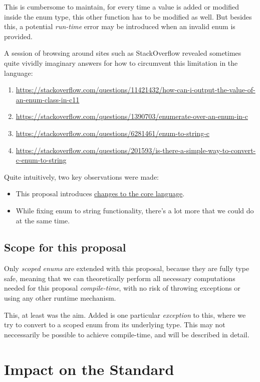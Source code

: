 \documentclass[
  format=manuscript,
  screen=true,
  review=false,
  nonacm=true,
  timestamp=true,
  balance=false]{acmart}
\begin{document}
\noindent
This is cumbersome to maintain, for every time a value is added or modified inside
the enum type, this other function has to be modified as well. But besides this,
a potential \textit{run-time} error may be introduced when an invalid enum is
provided.

A session of browsing around sites such as StackOverflow revealed sometimes quite
vividly imaginary answers for how to circumvent this limitation in the language:

\begin{enumerate}
\item \url{https://stackoverflow.com/questions/11421432/how-can-i-output-the-value-of-an-enum-class-in-c11}
\item \url{https://stackoverflow.com/questions/1390703/enumerate-over-an-enum-in-c}
\item \url{https://stackoverflow.com/questions/6281461/enum-to-string-c}
\item \url{https://stackoverflow.com/questions/201593/is-there-a-simple-way-to-convert-c-enum-to-string}
\end{enumerate}

\noindent
Quite intuitively, two key observations were made:

\begin{itemize}
\item This proposal introduces \underline{changes to the core language}.
\item While fixing enum to string functionality, there's a lot more that we could do at the same time.
\end{itemize}

\subsection{Scope for this proposal}

Only \textit{scoped enums} are extended with this proposal, because they are fully
type safe, meaning that we can theoretically perform all necessary computations needed
for this proposal \textit{compile-time}, with no risk of throwing exceptions or using
any other runtime mechanism.

This, at least was the aim. Added is one particular \textit{exception} to this,
where we try to convert to a scoped enum from its underlying type. This may not
neccessarily be possible to achieve compile-time, and will be described in detail.


\section{Impact on the Standard}
\end{document}
